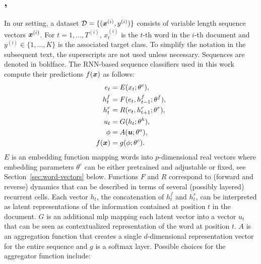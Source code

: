 \subsection{\maxp, \softmax}
\label{sec:model}
In our setting, a dataset $\mathcal{D}=\{(\bm{x}^{(i)},y^{(i)})\}$
consists of variable length sequence vectors $\bm{x}^{(i)}$. For
$t=1,\dots,T^{(i)}$, $x^{(i)}_t$ is the $t$-th word in the $i$-th
document and $y^{(i)}\in\{1,\dots,K\}$ is the associated target
class. To simplify the notation in the subsequent text, the
superscripts are not used unless necessary. Sequences are
denoted in boldface. The RNN-based sequence classifiers used in
this work compute their predictions $f(\bm{x})$ as follows:
\begin{align}
  e_t &= E(x_t;\theta^e),\label{eq:embed}\\
  h^f_t &= F(e_t,h^f_{t-1};\theta^f),\label{eq:maxModelRL}\\  
  h^r_t &= R(e_t,h^r_{t+1};\theta^r),\label{eq:maxModelRR}\\
  u_t &= G(h_t;\theta^h),\label{eq:maxModelF}\\
  \phi &= A(\bm{u};\theta^a),\label{eq:aggregation}\\
  f(\bm{x}) &= g(\phi;\theta^c).\label{eq:maxModelC}
\end{align}
$E$ is an embedding function mapping words into $p$-dimensional real
vectors where embedding parameters $\theta^e$ can be either
pretrained and adjustable or fixed, see Section~\ref{sec:word-vectors}
below.  Functions $F$ and $R$ correspond to (forward and reverse)
dynamics that can be described in terms of several (possibly layered)
recurrent cells. Each vector $h_t$,
the concatenation of $h^f_t$ and $h^r_t$, can be interpreted as latent
representations of the information contained at position $t$ in the
document. $G$ is an additional \ac{mlp} mapping each latent vector into a
vector $u_t$ that can be seen as contextualized representation of the
word at position $t$. $A$ is an aggregation function that creates a
single $d$-dimensional representation vector for the entire sequence
and $g$ is a softmax layer. Possible choices for the aggregator
function include:
